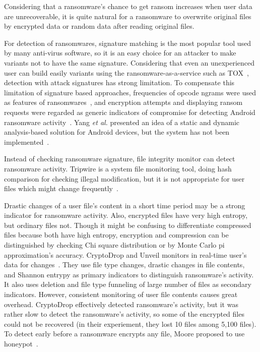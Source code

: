 \documentclass[conference]{IEEEtran}
\newcommand{\etal}{{\it et al.}\xspace}
\begin{document}
Considering that a ransomware's chance to get ransom increases when user data are 
unrecoverable, it is quite natural for a ransomware to overwrite original files 
by encrypted data or random data after reading original files. 

For detection of ransomwares, signature matching is the most popular tool 
used by many anti-virus software,
so it is an easy choice for an attacker to make variants not to have the same signature.
Considering that even an unexperienced user can build easily variants 
using the ransomware-as-a-service such as TOX~\cite{walter15}, 
detection with attack signatures has strong limitation. 
To compensate this limitation of signature based approaches, 
frequencies of opcode ngrams were used as features of ransomwares~\cite{canfora15},
and encryption attempts and displaying ransom requests were regarded 
as generic indicators of compromise for detecting Android ransomware activity~\cite{andronio15}.
Yang \etal presented an idea of a static and dynamic analysis-based solution 
for Android devices, but the system has not been implemented~\cite{yang15}.

Instead of checking ransomware signature, file integrity monitor can detect 
ransomware activity. Tripwire is a system file monitoring tool, doing hash comparison
for checking illegal modification, but it is not appropriate for user files 
which might change frequently~\cite{kim94}.

Drastic changes of a user file's content in a short time period may be a strong indicator 
for ransomware activity. Also, encrypted files have very high entropy, but ordinary files not. 
Though it might be confusing to differentiate compressed files 
because both have high entropy, 
encryption and compression can be distinguished by checking Chi square distribution 
or by Monte Carlo pi approximation's accuracy. 
CryptoDrop and Unveil monitors in real-time user's data for changes~\cite{scaife16,kharaz}.
They use file type changes, drastic changes in file contents, 
and Shannon entrypy as primary indicators 
to distinguish ransomware's activity. It also uses deletion and file type funneling 
of large number of files as secondary indicators. 
However, consistent monitoring of user file contents causes great overhead.
CryptoDrop effectively detected ransomware's activity, but it was rather slow to detect
the ransomware's activity, so some of the encrypted files could not be recovered 
(in their experiement, they lost 10 files among 5,100 files).
To detect early before a ransomware encrypts any file, Moore proposed to use honeypot~\cite{moore16}.
\end{document}
